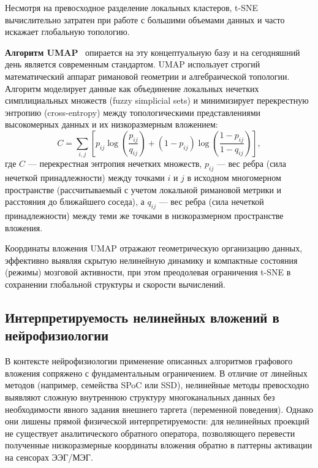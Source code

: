 Несмотря на превосходное разделение локальных кластеров, t-SNE вычислительно затратен при работе с большими объемами данных и часто искажает глобальную топологию.

\textbf{Алгоритм UMAP}~\cite{mcinnes2018umap} опирается на эту концептуальную базу и на сегодняшний день является современным стандартом. UMAP использует строгий математический аппарат римановой геометрии и алгебраической топологии. Алгоритм моделирует данные как объединение локальных нечетких симплициальных множеств (fuzzy simplicial sets) и минимизирует перекрестную энтропию (cross-entropy) между топологическими представлениями высокомерных данных и их низкоразмерным вложением:
\begin{equation}
	C = \sum_{i,j} \left[ p_{ij} \log\left(\frac{p_{ij}}{q_{ij}}\right) + (1 - p_{ij}) \log\left(\frac{1 - p_{ij}}{1 - q_{ij}}\right) \right],
\end{equation}
где $C$ --- перекрестная энтропия нечетких множеств, $p_{ij}$ --- вес ребра (сила нечеткой принадлежности) между точками $i$ и $j$ в исходном многомерном пространстве (рассчитываемый с учетом локальной римановой метрики и расстояния до ближайшего соседа), а $q_{ij}$ --- вес ребра (сила нечеткой принадлежности) между теми же точками в низкоразмерном пространстве вложения.

Координаты вложения UMAP отражают геометрическую организацию данных, эффективно выявляя скрытую нелинейную динамику и компактные состояния (режимы) мозговой активности, при этом преодолевая ограничения t-SNE в сохранении глобальной структуры и скорости вычислений.

\subsection{Интерпретируемость нелинейных вложений в нейрофизиологии}
\label{sec:nonlinear_interpretability}

В контексте нейрофизиологии применение описанных алгоритмов графового вложения сопряжено с фундаментальным ограничением. В отличие от линейных методов (например, семейства SPoC или SSD), нелинейные методы превосходно выявляют сложную внутреннюю структуру многоканальных данных без необходимости явного задания внешнего таргета (переменной поведения). Однако они лишены прямой физической интерпретируемости: для нелинейных проекций не существует аналитического обратного оператора, позволяющего перевести полученные низкоразмерные координаты вложения обратно в паттерны активации на сенсорах ЭЭГ/МЭГ. 


